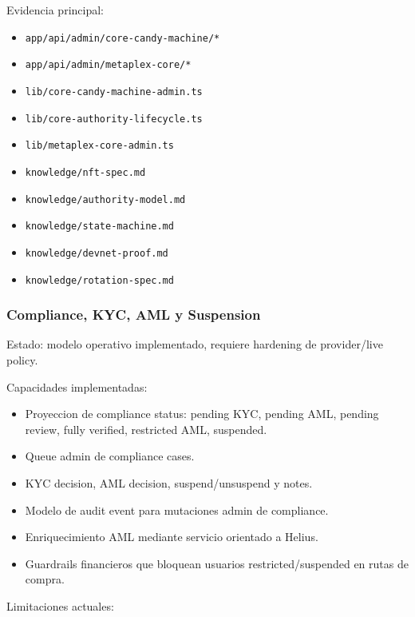 \documentclass[
  10pt,
  letterpaper,
]{article}
\providecommand{\tightlist}{%
  \setlength{\itemsep}{0pt}\setlength{\parskip}{0pt}}
\let\oldtexttt\texttt
\renewcommand{\texttt}[1]{\oldtexttt{\small #1}}
\begin{document}
Evidencia principal:

\begin{itemize}
\tightlist
\item
  \texttt{app/api/admin/core-candy-machine/*}
\item
  \texttt{app/api/admin/metaplex-core/*}
\item
  \texttt{lib/core-candy-machine-admin.ts}
\item
  \texttt{lib/core-authority-lifecycle.ts}
\item
  \texttt{lib/metaplex-core-admin.ts}
\item
  \texttt{knowledge/nft-spec.md}
\item
  \texttt{knowledge/authority-model.md}
\item
  \texttt{knowledge/state-machine.md}
\item
  \texttt{knowledge/devnet-proof.md}
\item
  \texttt{knowledge/rotation-spec.md}
\end{itemize}

\subsubsection{Compliance, KYC, AML y
Suspension}\label{compliance-kyc-aml-y-suspension}

Estado: modelo operativo implementado, requiere hardening de
provider/live policy.

Capacidades implementadas:

\begin{itemize}
\tightlist
\item
  Proyeccion de compliance status: pending KYC, pending AML, pending
  review, fully verified, restricted AML, suspended.
\item
  Queue admin de compliance cases.
\item
  KYC decision, AML decision, suspend/unsuspend y notes.
\item
  Modelo de audit event para mutaciones admin de compliance.
\item
  Enriquecimiento AML mediante servicio orientado a Helius.
\item
  Guardrails financieros que bloquean usuarios restricted/suspended en
  rutas de compra.
\end{itemize}

Limitaciones actuales:
\end{document}
